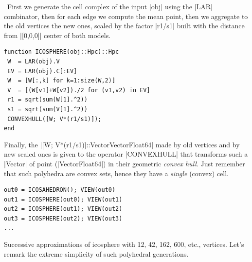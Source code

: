\begin{coding}\
First we generate the cell complex of the input |obj| using the |LAR| combinator, then for each edge we compute the mean point, then we aggregate to the old vertices the new ones, scaled by the factor |r1/s1| built with the distance from |[0,0,0]| center of both models.
\begin{lstlisting}[language=JuliaLocal, style=julia, mathescape=true]
function ICOSPHERE(obj::Hpc)::Hpc
 W  = LAR(obj).V
 EV = LAR(obj).C[:EV]
 W  = [W[:,k] for k=1:size(W,2)]
 V  = [(W[v1]+W[v2])./2 for (v1,v2) in EV]
 r1 = sqrt(sum(W[1].^2))
 s1 = sqrt(sum(V[1].^2))
 CONVEXHULL([W; V*(r1/s1)]);
end
\end{lstlisting}
Finally, the |[W; V*(r1/s1)]::Vector{Vector{Float64}}| made by old vertices and by new scaled ones is given to the operator |CONVEXHULL| that transforms such a |Vector| of point (|Vector{Float64}|) in their geometric \emph{convex hull}.
Just remember that such polyhedra are convex sets, hence they have a \emph{single} (convex) cell. \begin{lstlisting}[language=JuliaLocal, style=julia, mathescape=true]
out0 = ICOSAHEDRON(); VIEW(out0)
out1 = ICOSPHERE(out0); VIEW(out1)
out2 = ICOSPHERE(out1); VIEW(out2)
out3 = ICOSPHERE(out2); VIEW(out3)
...		
\end{lstlisting}
Successive approximations of icosphere with 12, 42, 162, 600, etc., vertices.
Let’s remark the extreme simplicity of such polyhedral generations.
\end{coding}

